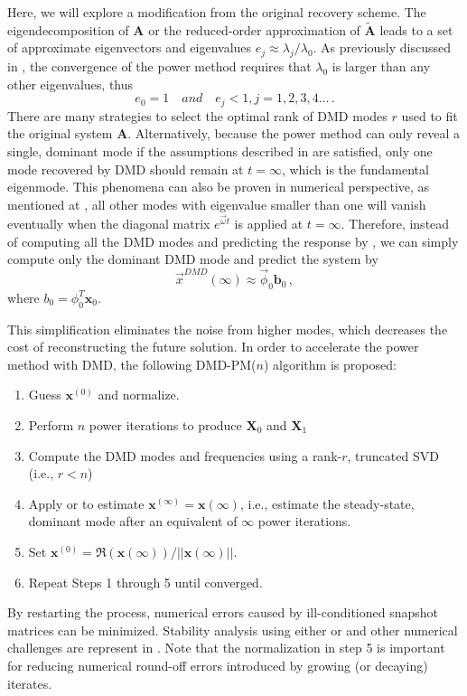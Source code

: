 Here, we will explore a modification from the original recovery scheme.
The eigendecomposition of $\mathbf{A}$ or the reduced-order approximation of $\mathbf{\tilde{A}}$ leads to a set of approximate eigenvectors and eigenvalues $e_j \approx \lambda_j / \lambda_0$.
As previously discussed in , the convergence of the power method requires that $\lambda_0$ is larger than any other eigenvalues, thus 
\begin{equation}
\label{eq:ej}
e_0 = 1 \quad and  \quad e_j < 1,j = 1,2,3,4... \, .
\end{equation}
There are many strategies to select the optimal rank of DMD modes $r$ used to fit the original system $\mathbf{A}$. 
Alternatively, because the power method can only reveal a single, dominant mode if the assumptions described in  are satisfied, only one mode recovered by DMD should remain at $t=\infty$, which is the fundamental eigenmode.
This phenomena can also be proven in numerical perspective, as mentioned at , all other modes with eigenvalue smaller than one will vanish eventually when the diagonal matrix $e^{\vec{\omega}t}$ is applied at $t=\infty$.
Therefore, instead of computing all the DMD modes and predicting the response by , we can simply compute only the dominant DMD mode and predict the system by 
\begin{equation}
\label{eq:f_mode}
\vec{x}^{DMD}(\infty) \approx \vec{\phi}_0 \mathbf{b}_0 \, ,
\end{equation}
where $b_0= \phi^{T}_0 \mathbf{x}_{0}$.

This simplification eliminates the noise from higher modes, which decreases the cost of reconstructing the future solution.
In order to accelerate the power method with DMD, the following DMD-PM($n$) algorithm is proposed:
\begin{enumerate}
 \item Guess $\mathbf{x}^{(0)}$ and normalize.
 \item Perform $n$ power iterations to produce $\mathbf{X}_0$ and $\mathbf{X}_1$
 \item Compute the DMD modes and frequencies using a rank-$r$, truncated  SVD (i.e., $r < n$)
 \item Apply  or  to estimate $\mathbf{x}^{(\infty)}=\mathbf{x}(\infty)$, i.e., estimate the steady-state, dominant mode after an equivalent of $\infty$ power iterations.
 \item Set $\mathbf{x}^{(0)} = \Re(\mathbf{x}(\infty)) / ||\mathbf{x}(\infty)||$.  
 \item Repeat Steps 1 through 5 until converged.
\end{enumerate}
By restarting the process, numerical errors caused by ill-conditioned snapshot matrices can be minimized.
Stability analysis using either  or  and other numerical challenges are represent in .
Note that the normalization in step 5 is important for reducing numerical round-off errors introduced by growing (or decaying) iterates.



